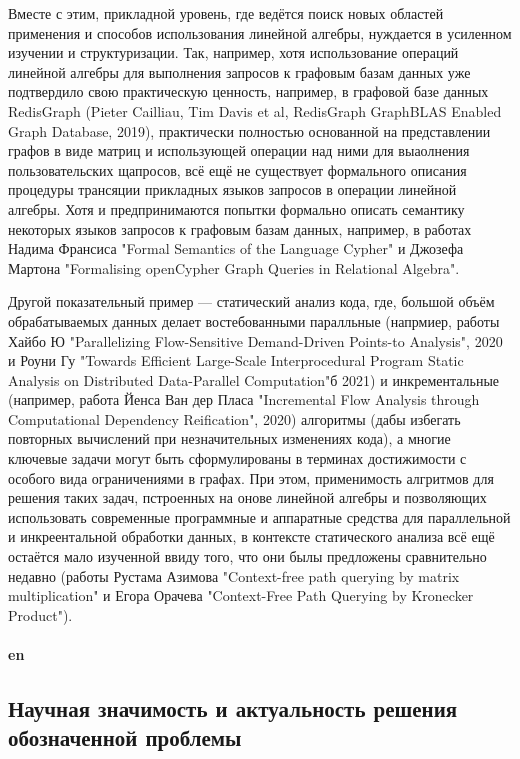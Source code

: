 \documentclass[12pt]{article}  %
\theoremstyle{remark}
\begin{document}
Вместе с этим, прикладной уровень, где ведётся поиск новых областей применения и способов использования линейной алгебры, нуждается в усиленном изучении и структуризации. Так, например, хотя использование операций линейной алгебры для выполнения запросов к графовым базам данных уже подтвердило свою практическую ценность, например, в графовой базе данных RedisGraph (Pieter Cailliau, Tim Davis et al, RedisGraph GraphBLAS Enabled Graph Database, 2019), практически полностью основанной на представлении графов в виде матриц и использующей операции над ними для выаолнения пользовательских щапросов, всё ещё не существует формального описания процедуры трансяции прикладных языков запросов в операции линейной алгебры. Хотя и предпринимаются попытки формально описать семантику некоторых языков запросов к графовым базам данных, например, в работах Надима Франсиса "Formal Semantics of the Language Cypher" и Джозефа Мартона "Formalising openCypher Graph Queries
in Relational Algebra". 

Другой показательный пример --- статический анализ кода, где, большой объём обрабатываемых данных делает востебованными паралльные (напрмиер, работы Хайбо Ю "Parallelizing Flow-Sensitive Demand-Driven Points-to Analysis", 2020 и Роуни Гу "Towards Efficient Large-Scale Interprocedural Program Static Analysis on Distributed Data-Parallel Computation"б 2021) и инкрементальные (например, работа Йенса Ван дер Пласа "Incremental Flow Analysis through Computational Dependency Reification", 2020) алгоритмы (дабы избегать повторных вычислений при незначительных изменениях кода), а многие ключевые задачи могут быть сформулированы в терминах достижимости с особого вида ограничениями в графах. При этом, применимость алгритмов для решения таких задач, пстроенных на онове линейной алгебры и позволяющих использовать современные программные и аппаратные средства для параллельной и инкреентальной обработки данных, в контексте статического анализа всё ещё остаётся мало изученной ввиду того, что они былы предложены сравнительно недавно (работы Рустама Азимова "Context-free path querying by matrix multiplication" и Егора Орачева "Context-Free Path Querying by Kronecker Product").
\\
\\
\textbf{en}\\



\subsection{Научная значимость и актуальность решения обозначенной проблемы}
\end{document}
